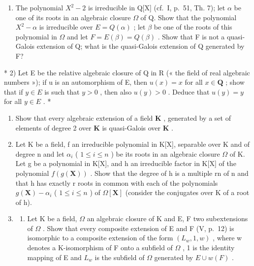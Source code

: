 \BourbakiExerciseGroup

\begin{enumerate}
\def\labelenumi{\arabic{enumi})}
\tightlist
\item
  The polynomial \(X^{2}-2\) is irreducible in Q{[}X{]} (cf.~I, p.~51, Th. 7); let \(\alpha\) be one of its roots in an algebraic closure \(\Omega\) of Q. Show that the polynomial \(X^{2}-\alpha\) is irreducible over \(E = Q(\alpha)\) ; let \(\beta\) be one of the roots of this polynomial in \(\Omega\) and let \(F = E(\beta) = Q(\beta)\) . Show that F is not a quasi-Galois extension of Q; what is the quasi-Galois extension of Q generated by F?
\end{enumerate}

* 2) Let E be the relative algebraic closure of Q in R (« the field of real algebraic numbers »); if u is an automorphism of E, then \(u(x) = x\) for all \(x \in \mathbf{Q}\) ; show that if \(y \in E\) is such that \(y > 0\) , then also \(u(y) > 0\) . Deduce that \(u(y) = y\) for all \(y \in E\) . *

\begin{enumerate}
\def\labelenumi{\arabic{enumi})}
\setcounter{enumi}{2}
\item
  Show that every algebraic extension of a field \(\mathbf{K}\) , generated by a set of elements of degree 2 over \(\mathbf{K}\) is quasi-Galois over \(\mathbf{K}\) .
\item
  Let K be a field, f an irreducible polynomial in K{[}X{]}, separable over K and of degree n and let \(\alpha_{i}\) ( \(1 \leqslant i \leqslant n\) ) be its roots in an algebraic closure \(\Omega\) of K. Let g be a polynomial in K{[}X{]}, and h an irreducible factor in K{[}X{]} of the polynomial \(f(g(\mathbf{X}))\) . Show that the degree of h is a multiple rn of n and that h has exactly r roots in common with each of the polynomials \(g(\mathbf{X}) - \alpha_{i}\) ( \(1 \leqslant i \leqslant n\) ) of \(\Omega[\mathbf{X}]\) (consider the conjugates over K of a root of h).
\item
  \begin{enumerate}
  \def\labelenumii{\alph{enumii})}
  \tightlist
  \item
    Let K be a field, \(\Omega\) an algebraic closure of K and E, F two subextensions of \(\Omega\) . Show that every composite extension of E and F (V, p.~12) is isomorphic to a composite extension of the form \((L_{w}, 1, w)\) , where w denotes a K-isomorphism of F onto a subfield of \(\Omega\) , 1 is the identity mapping of E and \(L_{w}\) is the subfield of \(\Omega\) generated by \(E \cup w(F)\) .
  \end{enumerate}
\end{enumerate}

